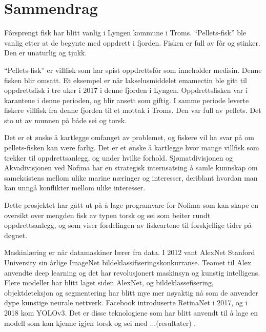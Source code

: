 \section*{Sammendrag}




Fôrsprengt fisk har blitt vanlig i Lyngen kommune i Troms. ``Pellets-fisk” ble vanlig etter at de begynte med oppdrett i fjorden. Fisken er full av fôr og stinker. Den er unaturlig og tjukk.

``Pellets-fisk'' er villfisk som har spist oppdrettsfôr som inneholder medisin. Denne fisken blir omsatt. Et eksempel er når lakselusmiddelet emamectin ble gitt til oppdrettsfisk i tre uker i 2017 i denne fjorden i Lyngen. Oppdrettsfisken var i karantene i denne perioden, og blir ansett som giftig. I samme periode leverte fiskere villfisk fra denne fjorden til et mottak i Troms. Den var full av pellets. Det sto ut av munnen på både sei og torsk.

Det er et ønske å kartlegge omfanget av problemet, og fiskere vil ha svar på om pellets-fisken kan være farlig. Det er et ønske å kartlegge hvor mange villfisk som trekker til oppdrettsanlegg, og under hvilke forhold. Sjømatdivisjonen og Akvadivisjonen ved Nofima har en strategisk internsatsing å samle kunnskap om sameksistens mellom ulike marine næringer og interesser, deriblant hvordan man kan unngå konflikter mellom ulike interesser.

Dette prosjektet har gått ut på å lage programvare for Nofima som kan skape en oversikt over mengden fisk av typen torsk og sei som beiter rundt oppdrettsanlegg, og som viser fordelingen av fiskeartene til forskjellige tider på døgnet.


Maskinlæring er når datamaskiner lærer fra data. I 2012 vant AlexNet Stanford University sin årlige ImageNet bildeklassifiseringskonkurranse. Teamet til Alex anvendte deep learning og det har revolusjonert maskinsyn og kunstig intelligens. Flere modeller har blitt laget siden AlexNet, og bildeklassefisering, objektdeteksjon og segmentering har blitt mye mer nøyaktig nå som de anvender dype kunstige neurale nettverk. Facebook introduserte RetinaNet i 2017, og i 2018 kom YOLOv3. Det er disse teknologiene som har blitt anvendt til å lage en modell som kan kjenne igjen torsk og sei med ...(resultater) .

